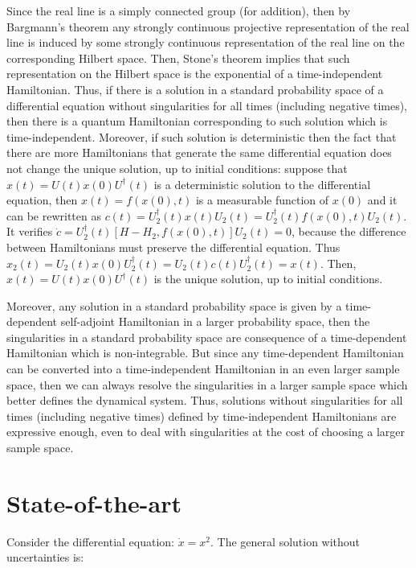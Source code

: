 \documentclass[11pt]{book}
\begin{document}
Since the real line is a simply connected group (for addition), then by
Bargmann's theorem any strongly continuous projective representation of
the real line is induced by some strongly continuous representation of
the real line on the corresponding Hilbert
space\cite{cassinelli2004theory}\cite{SIMMS1971283}. Then, Stone's
theorem implies that such representation on the Hilbert space is the
exponential of a time-independent
Hamiltonian\cite{cassinelli2004theory}\cite{SIMMS1971283}. Thus, if
there is a solution in a standard probability space of a differential
equation without singularities for all times (including negative times),
then there is a quantum Hamiltonian corresponding to such solution which
is time-independent. Moreover, if such solution is deterministic then
the fact that there are more Hamiltonians that generate the same
differential equation does not change the unique solution, up to initial
conditions: suppose that \(x(t)=U(t)x(0)U^\dagger(t)\) is a
deterministic solution to the differential equation, then
\(x(t)=f(x(0),t)\) is a measurable function of \(x(0)\) and it can be
rewritten as
\(c(t)=U^\dagger_2(t)x(t)U_2(t)=U^\dagger_2(t)f(x(0),t)U_2(t)\). It
verifies \(\dot{c}=U^\dagger_2(t)[H-H_2,f(x(0),t)]U_2(t)=0\), because
the difference between Hamiltonians must preserve the differential
equation. Thus
\(x_2(t)=U_2(t)x(0)U^\dagger_2(t)=U_2(t)c(t)U^\dagger_2(t)=x(t)\). Then,
\(x(t)=U(t)x(0)U^\dagger(t)\) is the unique solution, up to initial
conditions.

Moreover, any solution in a standard probability space is given by a
time-dependent self-adjoint Hamiltonian in a larger probability space,
then the singularities in a standard probability space are consequence
of a time-dependent Hamiltonian which is non-integrable. But since any
time-dependent Hamiltonian can be converted into a time-independent
Hamiltonian in an even larger sample space, then we can always resolve
the singularities in a larger sample space which better defines the
dynamical system. Thus, solutions without singularities for all times
(including negative times) defined by time-independent Hamiltonians are
expressive enough, even to deal with singularities at the cost of
choosing a larger sample space.

\hypertarget{state-of-the-art}{%
\section{State-of-the-art}\label{state-of-the-art}}

Consider the differential equation: \(\dot{x}=x^2\). The general
solution without uncertainties is:
\end{document}
